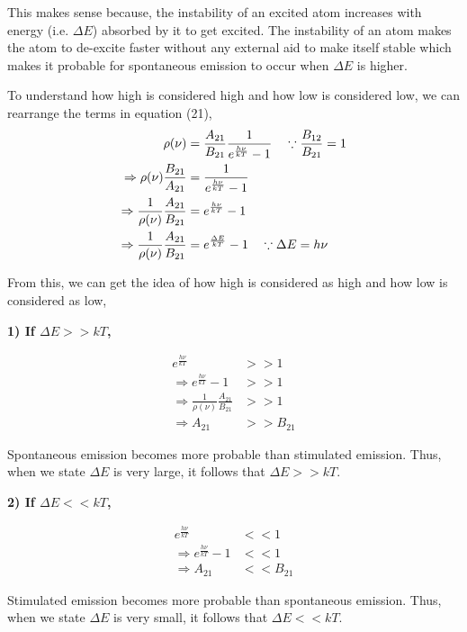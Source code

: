 \documentclass[12pt]{article}
\begin{document}
This makes sense because, the instability of an excited atom increases with energy (i.e. $\Delta E$) absorbed by it to get excited. The instability of an atom makes the atom to de-excite faster without any external aid to make itself stable which makes it probable for spontaneous emission to occur when $\Delta E$ is higher. \vspace{.2cm}

To understand how high is considered high and how low is considered low, we can rearrange the terms in equation (21),
\begin{align}
    \rho(\nu) & = \frac{A_{21}}{B_{21}} \frac{1}{e^\frac{h\nu}{kT} - 1} \quad \because \frac{B_{12}}{B_{21}} = 1 \notag \\
    \Rightarrow \rho(\nu) \frac{B_{21}}{A_{21}} & = \frac{1}{e^\frac{h\nu}{kT} - 1} \notag \\
    \Rightarrow \frac{1}{\rho(\nu)} \frac{A_{21}}{B_{21}} & = e^\frac{h\nu}{kT} - 1 \notag \\
    \Rightarrow \frac{1}{\rho(\nu)} \frac{A_{21}}{B_{21}} & = e^\frac{\Delta E}{kT} - 1 \quad \because \Delta E = h\nu
\end{align} \vspace{.2cm}

From this, we can get the idea of how high is considered as high and how low is considered as low,
\begin{block}
    \textbf{1) If $\Delta E >> kT$,}

    \begin{block}[left=1cm, top=-.5cm]
        \begin{align*}
            e^{\frac{h\nu}{kT}} & >> 1 \\
            \Rightarrow e^{\frac{h\nu}{kT}} - 1 & >> 1 \\
            \Rightarrow \frac{1}{\rho(\nu)} \frac{A_{21}}{B_{21}} & >> 1 \\
            \Rightarrow A_{21} & >> B_{21}
        \end{align*}

        Spontaneous emission becomes more probable than stimulated emission. Thus, when we state $\Delta E$ is very large, it follows that $\Delta E >> kT$. 
    \end{block}

    \textbf{2) If $\Delta E << kT$,}

    \begin{block}[left=1cm, top=-.5cm]
        \begin{align*}
            e^{\frac{h\nu}{kT}} & << 1 \\
            \Rightarrow e^{\frac{h\nu}{kT}} - 1 & << 1 \\
            \Rightarrow A_{21} & << B_{21}
        \end{align*}
    
        Stimulated emission becomes more probable than spontaneous emission. Thus, when we state $\Delta E$ is very small, it follows that $\Delta E << kT$. 
    \end{block}
\end{block}
\end{document}
